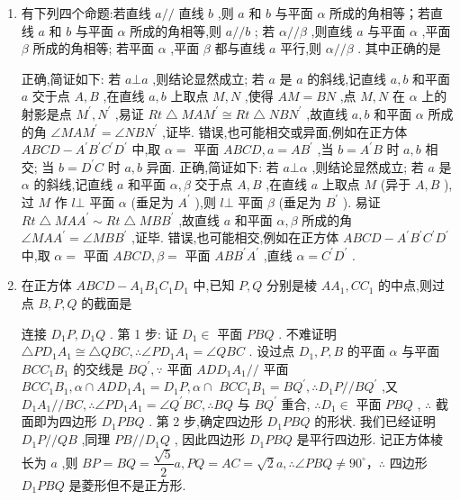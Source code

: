 \begin{enumerate}
    \item 有下列四个命题:若直线 $a//$ 直线 $b$ ,则 $a$ 和 $b$ 与平面 $\alpha$ 所成的角相等；若直线 $a$ 和 $b$ 与平面 $\alpha$ 所成的角相等,则 $a//b$ ; 若 $\alpha //\beta$ ,则直线 $a$ 与平面 $\alpha$ ,平面 $\beta$ 所成的角相等; 若平面 $\alpha$ ,平面 $\beta$ 都与直线 $a$ 平行,则 $\alpha //\beta$ . 其中正确的是
    \begin{jieda}
        正确,简证如下: 若 $a\bot a$ ,则结论显然成立; 若 $a$ 是 $a$ 的斜线,记直线 $a,b$ 和平面 $a$ 交于点 $A,B$ ,在直线 $a,b$ 上取点 $M,N$ ,使得 ${AM} = {BN}$ ,点 $M,N$ 在 $\alpha$ 上的射影是点 ${M}^{\prime },{N}^{\prime }$ ,易证 ${{Rt}}\bigtriangleup {MA}{M}^{\prime } \cong  {{Rt}}\bigtriangleup {NB}{N}^{\prime }$ ,故直线 $a,b$ 和平面 $\alpha$ 所成的角 $\angle {MA}{M}^{\prime } = \angle {NB}{N}^{\prime }$ ,证毕. 错误,也可能相交或异面,例如在正方体 ${ABCD} - {A}^{\prime }{B}^{\prime }{C}^{\prime }{D}^{\prime }$ 中,取 $\alpha  =$ 平面 ${ABCD},a = A{B}^{\prime }$ ,当 $b = {A}^{\prime }B$ 时 $a,b$ 相交; 当 $b = {D}^{\prime }C$ 时 $a,b$ 异面. 正确,简证如下: 若 $a\bot \alpha$ ,则结论显然成立; 若 $a$ 是 $\alpha$ 的斜线,记直线 $a$ 和平面 $\alpha ,\beta$ 交于点 $A,B$ ,在直线 $a$ 上取点 $M$ (异于 $A,B$ ),过 $M$ 作 $l \bot$ 平面 $\alpha$ (垂足为 ${A}^{\prime }$ ),则 $l \bot$ 平面 $\beta$ (垂足为 ${B}^{\prime }$ ). 易证 ${{Rt}}\bigtriangleup {MA}{A}^{\prime } \sim  {{Rt}}\bigtriangleup {MB}{B}^{\prime }$ ,故直线 $a$ 和平面 $\alpha ,\beta$ 所成的角 $\angle {MA}{A}^{\prime } = \angle {MB}{B}^{\prime }$ ,证毕. 错误,也可能相交,例如在正方体 ${ABCD} - {A}^{\prime }{B}^{\prime }{C}^{\prime }{D}^{\prime }$ 中,取 $\alpha  =$ 平面 ${ABCD},\beta  =$ 平面 ${AB}{B}^{\prime }{A}^{\prime }$ ,直线 $\alpha  = {C}^{\prime }{D}^{\prime }$ .
    \end{jieda}
    \item 在正方体 ${ABCD} - {A}_{1}{B}_{1}{C}_{1}{D}_{1}$ 中,已知 $P,Q$ 分别是棱 $A{A}_{1},C{C}_{1}$ 的中点,则过点 $B,P,Q$ 的截面是
    \begin{jieda}
        连接 ${D}_{1}P,{D}_{1}Q$ . 第 1 步: 证 ${D}_{1} \in$ 平面 ${PBQ}$ . 不难证明 $\bigtriangleup P{D}_{1}{A}_{1} \cong  \bigtriangleup {QBC},\therefore \angle P{D}_{1}{A}_{1} = \angle {QBC}$ . 设过点 ${D}_{1},P,B$ 的平面 $\alpha$ 与平面 ${BC}{C}_{1}{B}_{1}$ 的交线是 $B{Q}^{\prime },\because$ 平面 ${AD}{D}_{1}{A}_{1}//$ 平面 ${BC}{C}_{1}{B}_{1},\alpha  \cap  {AD}{D}_{1}{A}_{1} = {D}_{1}P,\alpha  \cap$  ${BC}{C}_{1}{B}_{1} = B{Q}^{\prime },\therefore {D}_{1}P//B{Q}^{\prime }$ ,又 ${D}_{1}{A}_{1}//{BC},\therefore \angle P{D}_{1}{A}_{1} = \angle {Q}^{\prime }{BC},\therefore {BQ}$ 与 $B{Q}^{\prime }$ 重合, $\therefore {D}_{1} \in$ 平面 ${PBQ}$ , $\therefore$ 截面即为四边形 ${D}_{1}{PBQ}$ . 第 2 步,确定四边形 ${D}_{1}{PBQ}$ 的形状. 我们已经证明 ${D}_{1}P//{QB}$ ,同理 ${PB}//{D}_{1}Q$ , 因此四边形 ${D}_{1}{PBQ}$ 是平行四边形. 记正方体棱长为 $a$ ,则 ${BP} = {BQ} = \dfrac{\sqrt{5}}{2}a,{PQ} = {AC} = \sqrt{2}a,\therefore \angle {PBQ} \neq  {90}^{ \circ  }$，$\therefore$ 四边形 ${D}_{1}{PBQ}$ 是菱形但不是正方形.

\end{jieda}
\end{enumerate}

